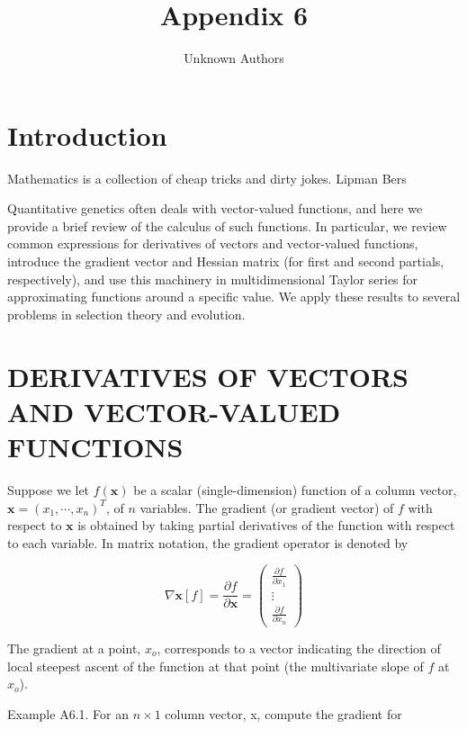 \documentclass{article}
\title{Appendix 6}
\author{Unknown Authors}
\date{}
\begin{document}
\maketitle

\begin{abstract}

\end{abstract}

\section{Introduction}
Mathematics is a collection of cheap tricks and dirty jokes. Lipman Bers

Quantitative genetics often deals with vector-valued functions, and here we provide a brief review of the calculus of such functions. In particular, we review common expressions for derivatives of vectors and vector-valued functions, introduce the gradient vector and Hessian matrix (for first and second partials, respectively), and use this machinery in multidimensional Taylor series for approximating functions around a specific value. We apply these results to several problems in selection theory and evolution.

\section{DERIVATIVES OF VECTORS AND VECTOR-VALUED FUNCTIONS}
Suppose we let $f(\mathbf{x})$ be a scalar (single-dimension) function of a column vector, $\mathbf{x} = (x_1, \cdots, x_n)^T$, of $n$ variables. The gradient (or gradient vector) of $f$ with respect to $\mathbf{x}$ is obtained by taking partial derivatives of the function with respect to each variable. In matrix notation, the gradient operator is denoted by

\begin{equation}
\nabla\mathbf{x}[f]=\frac{\partial f}{\partial\mathbf{x}}=\begin{pmatrix}\frac{\partial f}{\partial x_{1}}\\ \vdots\\ \frac{\partial f}{\partial x_{n}}\end{pmatrix}
\end{equation}

The gradient at a point,  $ x_{o} $, corresponds to a vector indicating the direction of local steepest ascent of the function at that point (the multivariate slope of  $ f $ at  $ x_{o} $).

Example A6.1. For an  $ n \times 1 $ column vector, x, compute the gradient for
\end{document}
